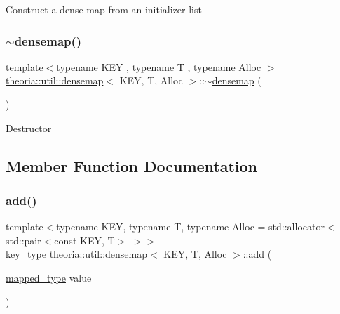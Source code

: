 Construct a dense map from an initializer list \mbox{\label{classtheoria_1_1util_1_1densemap_ac68e23ea5ed8af22b1772159537ab9ca}} 
\subsubsection{\texorpdfstring{$\sim$densemap()}{~densemap()}}
{\footnotesize\ttfamily template$<$typename K\+EY , typename T , typename Alloc $>$ \\
\hyperlink{classtheoria_1_1util_1_1densemap}{theoria\+::util\+::densemap}$<$ K\+EY, T, Alloc $>$\+::$\sim$\hyperlink{classtheoria_1_1util_1_1densemap}{densemap} (\begin{DoxyParamCaption}{ }\end{DoxyParamCaption})}

Destructor 

\subsection{Member Function Documentation}
\mbox{\label{classtheoria_1_1util_1_1densemap_a9ca5e32347009b58c2c225ee37cbc0fa}} 
\subsubsection{\texorpdfstring{add()}{add()}}
{\footnotesize\ttfamily template$<$typename K\+EY, typename T, typename Alloc = std\+::allocator$<$std\+::pair$<$const K\+E\+Y, T$>$ $>$$>$ \\
\hyperlink{classtheoria_1_1util_1_1densemap_afd285a46dc8f45b4b1556a656708d2a7}{key\+\_\+type} \hyperlink{classtheoria_1_1util_1_1densemap}{theoria\+::util\+::densemap}$<$ K\+EY, T, Alloc $>$\+::add (\begin{DoxyParamCaption}\item[{\hyperlink{classtheoria_1_1util_1_1densemap_a8c1e5a57a1e76089bd675da3fa3347d8}{mapped\+\_\+type}}]{value }\end{DoxyParamCaption})\hspace{0.3cm}{\ttfamily [inline]}}

